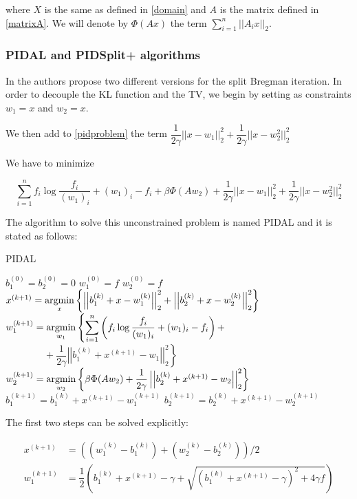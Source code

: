 where $X$ is the same as defined in \eqref{domain} and $A$ is the matrix defined in \eqref{matrixA}. We will denote by $\Phi(Ax)$ the term $ \sum_{i=1}^n ||A_i x||_2$.

\subsubsection{PIDAL and PIDSplit+ algorithms}

In \citep{deblurring} the authors propose two different versions for the split Bregman iteration. In order to decouple the KL function and the TV, we begin by setting as constraints $w_1 = x$ and $w_2 = x$.

We then add to \eqref{pidproblem} the term $\dfrac{1}{2\gamma} ||x-w_1||_2^2 + \dfrac{1}{2\gamma} ||x-w_2^2||_2^2$

We have to minimize

$$ \sum_{i=1}^n f_i \log \dfrac{f_i}{(w_1)_i}+(w_1)_i - f_i + \beta \Phi(Aw_2) + \dfrac{1}{2\gamma} ||x-w_1||_2^2 + \dfrac{1}{2\gamma} ||x-w_2^2||_2^2 $$

The algorithm to solve this unconstrained problem is named PIDAL and it is stated as follows:

\begin{algorithm}[H]
\caption{PIDAL}
\begin{algorithmic}
\STATE $b_1^{(0)} = b_2^{(0)} = 0$
\STATE
\STATE $w_1^{(0)} = f$
\STATE
\STATE $w_2^{(0)} = f$
\STATE
{}
\STATE
\STATE $x^{(k+1)} = \mathop{\mathrm{argmin}}\limits_x \left\{ \left|\left|b_1^{(k)}+x-w_1^{(k)}\right|\right|_2^2 + \left|\left|b_2^{(k)}+x-w_2^{(k)}\right|\right|_2^2 \right\}$
\STATE
\STATE $w_1^{(k+1)} = \mathop{\mathrm{argmin}}\limits_{w_1} \left\{ \displaystyle \sum_{i=1}^n \left( f_i \log \frac{f_i}{(w_1)_i} + (w_1)_i -f_i\right) + \right.$
\STATE $\left.\qquad\qquad + \dfrac{1}{2\gamma} \left|\left|b_1^{(k)} + x^{(k+1)} - w_1 \right|\right|_2^2 \right\}$
\STATE
\STATE $w_2^{(k+1)} = \mathop{\mathrm{argmin}}\limits_{w_2} \left\{\beta \Phi(Aw_2) + \dfrac{1}{2\gamma}\left|\left|b_2^{(k)}+x^{(k+1)} - w_2\right|\right|_2^2\right\}$
\STATE
\STATE $b_1^{(k+1)} = b_1^{(k)} + x^{(k+1)} -w_1^{(k+1)}$
\STATE
\STATE $b_2^{(k+1)} = b_2^{(k)} + x^{(k+1)} -w_2^{(k+1)}$
\ENDFOR
\end{algorithmic}
\end{algorithm}

The first two steps can be solved explicitly:

\begin{align*}
x^{(k+1)} &= \left(\left(w_1^{(k)} -b_1^{(k)}\right) + \left(w_2^{(k)} -b_2^{(k)}\right) \right) / 2 \\
w_1^{(k+1)} &= \dfrac{1}{2} \left(b_1^{(k)} + x^{(k+1)} - \gamma + \sqrt{\left(b_1^{(k)} + x^{(k+1)}-\gamma\right)^2 + 4\gamma f} \right)
\end{align*}

